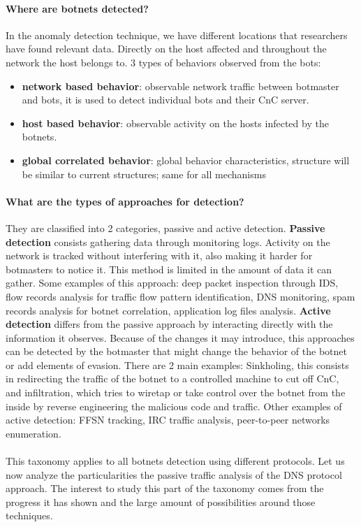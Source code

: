 \paragraph{Where are botnets detected?} In the anomaly detection technique, we have different locations that researchers have found relevant data. Directly on the host affected and throughout the network the host belongs to.
3 types of behaviors observed from the bots\cite{bot-threat1}:
\begin{itemize}
\item \textbf{network based behavior}: observable network traffic between botmaster and bots, it is used to detect individual bots and their CnC server. 
\item \textbf{host based behavior}: observable activity on the hosts infected by the botnets. 
\item \textbf{global correlated behavior}: global behavior characteristics, structure will be similar to current structures; same for all mechanisms
\end{itemize}
\paragraph{What are the types of approaches for detection?}
They are classified into 2 categories, passive and active detection\cite{detection9}. \textbf{Passive detection} consists gathering data through monitoring logs. Activity on the network is tracked without interfering with it, also making it harder for botmasters to notice it. This method is limited in the amount of data it can gather. Some examples of this approach: deep packet inspection through IDS, flow records analysis for traffic flow pattern identification, DNS monitoring, spam records analysis for botnet correlation, application log files analysis. \textbf{Active detection} differs from the passive approach by interacting directly with the information it observes. Because of the changes it may introduce, this approaches can be detected by the botmaster that might change the behavior of the botnet or add elements of evasion. There are 2 main examples: Sinkholing, this consists in redirecting the traffic of the botnet to a controlled machine to cut off CnC, and infiltration, which tries to wiretap or take control over the botnet from the inside by reverse engineering the malicious code and traffic. Other examples of active detection: FFSN tracking, IRC traffic analysis, peer-to-peer networks enumeration.
\\\\
This taxonomy applies to all botnets detection using different protocols. 
Let us now analyze the particularities the passive traffic analysis of the DNS protocol approach. The interest to study this part of the taxonomy comes from the progress it has shown and the large amount of possibilities around those techniques.

